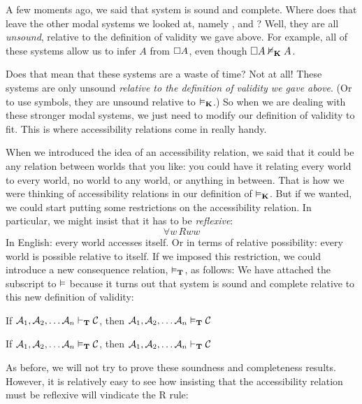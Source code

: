 A few moments ago, we said that system \mlK{} is sound and complete. Where does that leave the other modal systems we looked at, namely  \mlT, \mlSfour{} and \mlSfive? Well, they are all \emph{unsound}, relative to the definition of validity we gave above. For example, all of these systems allow us to infer $A$ from $\Box A$, even though $\Box A\nvDash_{\mathbf{K}} A$.

Does that mean that these systems are a waste of time? Not at all! These systems are only unsound \emph{relative to the definition of validity we gave above}. (Or to use symbols, they are unsound relative to $\vDash_{\mathbf{K}}$.) So when we are dealing with these stronger modal systems, we just need to modify our definition of validity to fit. This is where accessibility relations come in really handy.

When we introduced the idea of an accessibility relation, we said that it could be any relation between worlds that you like: you could have it relating every world to every world, no world to any world, or anything in between. That is how we were thinking of accessibility relations in our definition of $\vDash_{\mathbf{K}}$. But if we wanted, we could start putting some restrictions on the accessibility relation. In particular, we might insist that it has to be \emph{reflexive}:
\[\forall w\, Rww\]
In English: every world accesses itself. Or in terms of relative possibility: every world is possible relative to itself. If we imposed this restriction, we could introduce a new consequence relation, $\vDash_{\mathbf{T}}$, as follows:
We have attached the \mlT{} subscript to $\vDash$ because it turns out that system \mlT{} is sound and complete relative to this new definition of validity:
\begin{compactlist}
	\item If $\mathcal{A}_1,\mathcal{A}_2, \dots \mathcal{A}_n\vdash_{\mathbf{T}}\mathcal{C}$, then $\mathcal{A}_1,\mathcal{A}_2, \dots \mathcal{A}_n\vDash_{\mathbf{T}}\mathcal{C}$
	\item If $\mathcal{A}_1,\mathcal{A}_2, \dots \mathcal{A}_n\vDash_{\mathbf{T}}\mathcal{C}$, then $\mathcal{A}_1,\mathcal{A}_2, \dots \mathcal{A}_n\vdash_{\mathbf{T}}\mathcal{C}$
\end{compactlist}
As before, we will not try to prove these soundness and completeness results. However, it is relatively easy to see how insisting that the accessibility relation must be reflexive will vindicate the R\mlT{} rule:
